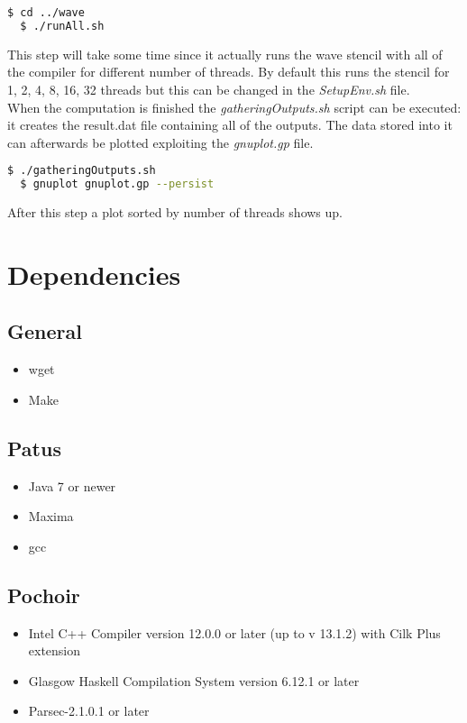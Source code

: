 \documentclass[AEJ]{AEA}
\begin{document}
\begin{lstlisting}[frame=single,language=bash]
  $ cd ../wave
  $ ./runAll.sh
\end{lstlisting}

This step will take some time since it actually runs the wave stencil with all of the compiler for different number of threads. By default this runs the stencil for 1, 2, 4, 8, 16, 32 threads but this can be changed in the \emph{SetupEnv.sh} file.
\\
When the computation is finished the \emph{gatheringOutputs.sh} script can be executed: it creates the result.dat file containing all of the outputs. The data stored into it can afterwards be plotted exploiting the \emph{gnuplot.gp} file.

\begin{lstlisting}[frame=single,language=bash]
  $ ./gatheringOutputs.sh
  $ gnuplot gnuplot.gp --persist
\end{lstlisting}

After this step a plot sorted by number of threads shows up.
\newpage
\section{Dependencies}
\subsection{General}
\begin{itemize}
	\item wget
	\item Make
\end{itemize}

\subsection{Patus}
\begin{itemize}
	\item Java 7 or newer
	\item Maxima
	\item gcc
\end{itemize}
\subsection{Pochoir}

\begin{itemize}
	\item Intel C++ Compiler version 12.0.0 or later (up to v 13.1.2) with Cilk Plus extension
	\item Glasgow Haskell Compilation System version 6.12.1 or later
	\item Parsec-2.1.0.1 or later
\end{itemize}
\end{document}
